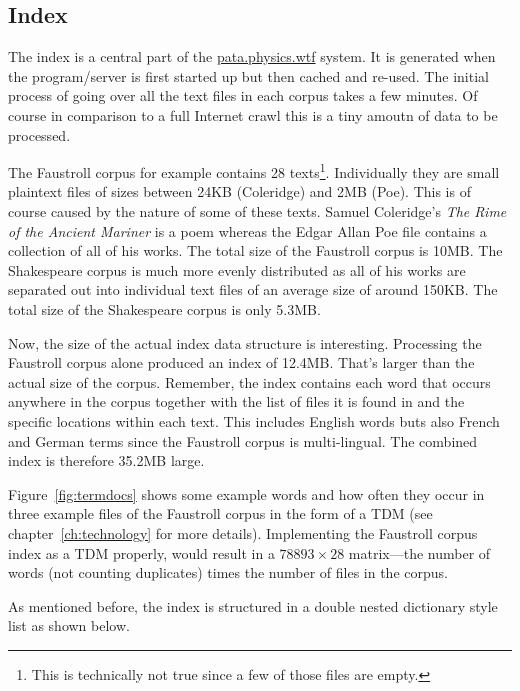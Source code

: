 \subsection{Index}
\label{s:analindex}

The index is a central part of the \url{pata.physics.wtf} system. It is generated when the program/server is first started up but then cached and re-used. The initial process of going over all the text files in each corpus takes a few minutes. Of course in comparison to a full Internet crawl this is a tiny amoutn of data to be processed. 

The Faustroll corpus for example contains \num{28} texts\footnote{This is technically not true since a few of those files are empty.}. Individually they are small plaintext files of sizes between 24KB (Coleridge) and 2MB (Poe). This is of course caused by the nature of some of these texts. Samuel Coleridge's \textit{The Rime of the Ancient Mariner} is a poem whereas the Edgar Allan Poe file contains a collection of all of his works. The total size of the Faustroll corpus is 10MB. The Shakespeare corpus is much more evenly distributed as all of his works are separated out into individual text files of an average size of around 150KB. The total size of the Shakespeare corpus is only 5.3MB.

Now, the size of the actual index data structure is interesting. Processing the Faustroll corpus alone produced an index of 12.4MB. That's larger than the actual size of the corpus. Remember, the index contains each word that occurs anywhere in the corpus together with the list of files it is found in and the specific locations within each text. This includes English words buts also French and German terms since the Faustroll corpus is multi-lingual. The combined index is therefore 35.2MB large.

Figure~\ref{fig:termdocs} shows some example words and how often they occur in three example files of the Faustroll corpus in the form of a \ac{TDM} (see chapter~\ref{ch:technology} for more details). Implementing the Faustroll corpus index as a \ac{TDM} properly, would result in a $78893 \times 28$ matrix---the number of words (not counting duplicates) times the number of files in the corpus.

\spirals

As mentioned before, the index is structured in a double nested dictionary style list as shown below.

